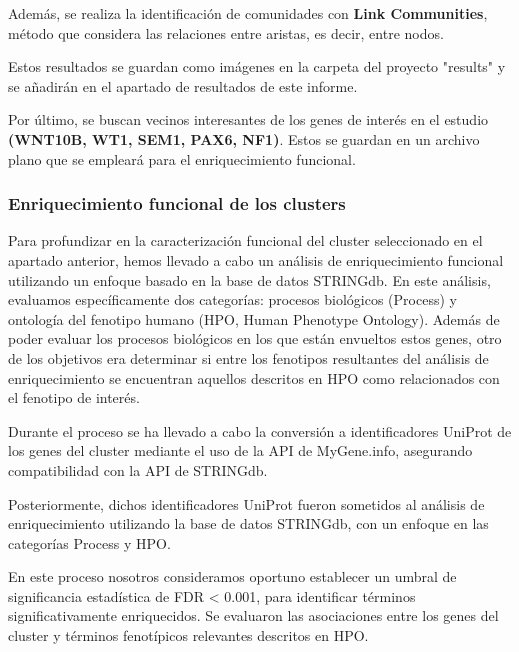 Además, se realiza la identificación de comunidades con \textbf{Link Communities}, método que considera las relaciones entre aristas, es decir, entre nodos.

Estos resultados se guardan como imágenes en la carpeta del proyecto "results" y se añadirán en el apartado de resultados de este informe.

Por último, se buscan vecinos interesantes de los genes de interés en el estudio \textbf{(WNT10B, WT1, SEM1, PAX6, NF1)}. Estos se guardan en un archivo plano que se empleará para el enriquecimiento funcional.

\subsubsection{Enriquecimiento funcional de los clusters}
Para profundizar en la caracterización funcional del cluster seleccionado en el apartado anterior, hemos llevado a cabo un análisis de enriquecimiento funcional utilizando un enfoque basado en la base de datos STRINGdb. En este análisis, evaluamos específicamente dos categorías: procesos biológicos (Process) y ontología del fenotipo humano (HPO, Human Phenotype Ontology). Además de poder evaluar los procesos biológicos en los que están envueltos estos genes, otro de los objetivos era determinar si entre los fenotipos resultantes del análisis de enriquecimiento se encuentran aquellos descritos en HPO como relacionados con el fenotipo de interés.

Durante el proceso se ha llevado a cabo la conversión a identificadores UniProt de los genes del cluster mediante el uso de la API de MyGene.info, asegurando compatibilidad con la API de STRINGdb.

Posteriormente, dichos identificadores UniProt fueron sometidos al análisis de enriquecimiento utilizando la base de datos STRINGdb, con un enfoque en las categorías Process y HPO. 

En este proceso nosotros consideramos oportuno establecer un umbral de significancia estadística de FDR < 0.001, para identificar términos significativamente enriquecidos.
Se evaluaron las asociaciones entre los genes del cluster y términos fenotípicos relevantes descritos en HPO.

